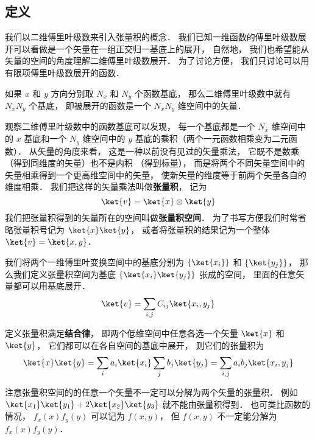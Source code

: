 

\subsection{定义}

我们以二维傅里叶级数来引入张量积的概念． 我们已知一维函数的傅里叶级数展开可以看做是一个矢量在一组正交归一基底上的展开， 自然地， 我们也希望能从矢量的空间的角度理解二维傅里叶级数展开． 为了讨论方便， 我们只讨论可以用有限项傅里叶级数展开的函数．

如果 $x$ 和 $y$ 方向分别取 $N_x$ 和 $N_y$ 个函数基底， 那么二维傅里叶级数中就有 $N_xN_y$ 个基底， 即被展开的函数是一个 $N_xN_y$ 维空间中的矢量．

观察二维傅里叶级数中的函数基底可以发现， 每一个基底都是一个 $N_x$ 维空间中的 $x$ 基底和一个 $N_y$ 维空间中的 $y$ 基底的乘积（两个一元函数相乘变为二元函数）． 从矢量的角度来看， 这是一种以前没有见过的矢量乘法， 它既不是数乘%
（得到同维度的矢量）也不是内积%
（得到标量）， 而是将两个不同矢量空间中的矢量相乘得到一个更高维空间中的矢量， 使新矢量的维度等于前两个矢量各自的维度相乘． 我们把这样的矢量乘法叫做\textbf{张量积}， 记为
\begin{equation}
\ket{v} = \ket{x} \otimes \ket{y}
\end{equation}
我们把张量积得到的矢量所在的空间叫做\textbf{张量积空间}． 为了书写方便我们时常省略张量积号记为 $\ket{x}\ket{y}$， 或者将张量积的结果记为一个整体 $\ket{v} = \ket{x, y}$．

我们将两个一维傅里叶变换空间中的基底分别为 $\{\ket{x_i}\}$ 和 $\{\ket{y_j}\}$， 那么我们定义张量积空间为基底 $\{\ket{x_i}\ket{y_j}\}$ 张成的空间， 里面的任意矢量都可以用基底展开．
\begin{equation}
\ket{v} = \sum_{i,j} C_{ij}\ket{x_i, y_j}
\end{equation}

定义张量积满足\textbf{结合律}， 即两个低维空间中任意各选一个矢量 $\ket{x}$ 和 $\ket{y}$， 它们都可以在各自空间的基底中展开， 则它们的张量积为
\begin{equation}\label{DirPro_eq2}
\ket{x}\ket{y} = \sum_i a_i\ket{x_i} \sum_j b_j\ket{y_j}
= \sum_{i,j} a_i b_j \ket{x_i, y_j}
\end{equation}

注意张量积空间的的任意一个矢量不一定可以分解为两个矢量的张量积． 例如 $\ket{x_1}\ket{y_1} + 2\ket{x_2}\ket{y_3}$ 就不能由张量积得到． 也可类比函数的情况， $f_x(x)f_y(y)$ 可以记为 $f(x, y)$， 但 $f(x, y)$ 不一定能分解为 $f_x(x)f_y(y)$．

